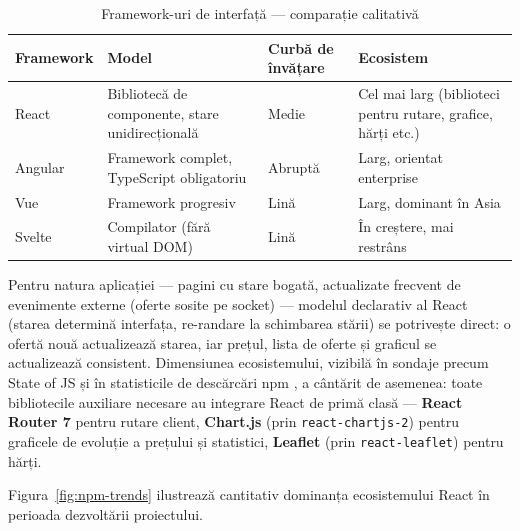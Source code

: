 \begin{table}[!ht]\small\linespread{1}
\centering
\caption{Framework-uri de interfață --- comparație calitativă}
\label{tab:comparatie-frontend}
\begin{tabular}{>{\raggedright\arraybackslash}p{2.4cm} >{\raggedright\arraybackslash}p{3.6cm} >{\raggedright\arraybackslash}p{3.4cm} >{\raggedright\arraybackslash}p{4.2cm}}
\toprule
\textbf{Framework} & \textbf{Model} & \textbf{Curbă de învățare} & \textbf{Ecosistem} \\
\midrule
React \cite{reactdocs} & Bibliotecă de componente, stare unidirecțională & Medie & Cel mai larg (biblioteci pentru rutare, grafice, hărți etc.) \\
Angular & Framework complet, TypeScript obligatoriu & Abruptă & Larg, orientat enterprise \\
Vue & Framework progresiv & Lină & Larg, dominant în Asia \\
Svelte & Compilator (fără virtual DOM) & Lină & În creștere, mai restrâns \\
\bottomrule
\end{tabular}
\end{table}

Pentru natura aplicației --- pagini cu stare bogată, actualizate frecvent de evenimente externe (oferte sosite pe socket) --- modelul declarativ al React (starea determină interfața, re-randare la schimbarea stării) se potrivește direct: o ofertă nouă actualizează starea, iar prețul, lista de oferte și graficul se actualizează consistent. Dimensiunea ecosistemului, vizibilă în sondaje precum State of JS \cite{stateofjs} și în statisticile de descărcări npm \cite{npmtrends}, a cântărit de asemenea: toate bibliotecile auxiliare necesare au integrare React de primă clasă --- \textbf{React Router 7} pentru rutare client, \textbf{Chart.js} \cite{chartjsdocs} (prin \texttt{react-chartjs-2}) pentru graficele de evoluție a prețului și statistici, \textbf{Leaflet} \cite{leafletdocs} (prin \texttt{react-leaflet}) pentru hărți.

Figura~\ref{fig:npm-trends} ilustrează cantitativ dominanța ecosistemului React în perioada dezvoltării proiectului.


